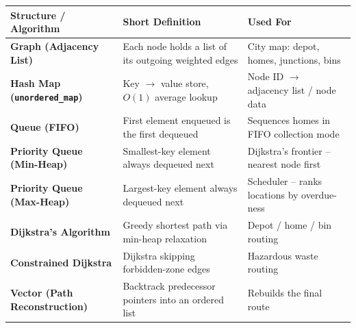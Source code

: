 \documentclass[aspectratio=169,11pt]{beamer}
\begin{document}
\begin{frame}{}
\scriptsize
\begin{center}
\renewcommand{\arraystretch}{1.12}
\begin{tabularx}{.98\textwidth}{@{}>{\bfseries}p{3.1cm}X p{4.0cm}@{}}
\toprule
Structure / Algorithm & Short Definition & Used For\\
\midrule
Graph (Adjacency List) & Each node holds a list of its outgoing weighted edges & City map: depot, homes, junctions, bins\\
Hash Map (\texttt{unordered\_map}) & Key $\to$ value store, $O(1)$ average lookup & Node ID $\to$ adjacency list / node data\\
Queue (FIFO) & First element enqueued is the first dequeued & Sequences homes in FIFO collection mode\\
Priority Queue (Min-Heap) & Smallest-key element always dequeued next & Dijkstra's frontier -- nearest node first\\
Priority Queue (Max-Heap) & Largest-key element always dequeued next & Scheduler -- ranks locations by overdue-ness\\
Dijkstra's Algorithm & Greedy shortest path via min-heap relaxation & Depot / home / bin routing\\
Constrained Dijkstra & Dijkstra skipping forbidden-zone edges & Hazardous waste routing\\
Vector (Path Reconstruction) & Backtrack predecessor pointers into an ordered list & Rebuilds the final route\\
\bottomrule
\end{tabularx}
\end{center}
\end{frame}
\end{document}
